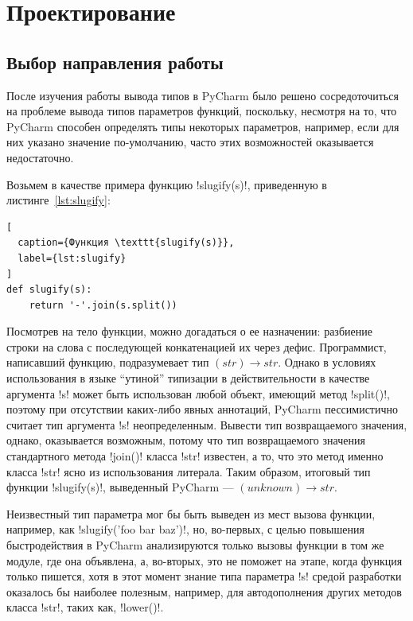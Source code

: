 \chapter{Проектирование}
\label{sec:designing}

\section{Выбор направления работы}
\label{sec:work-direction}

После изучения работы вывода типов в PyCharm было решено сосредоточиться на
проблеме вывода типов параметров функций, поскольку, несмотря на то, что PyCharm
способен определять типы некоторых параметров, например, если для них указано
значение по-умолчанию, часто этих возможностей оказывается недостаточно.

Возьмем в качестве примера функцию !slugify(s)!, приведенную в
листинге~\ref{lst:slugify}:

\begin{lstlisting}[
  caption={Функция \texttt{slugify(s)}},
  label={lst:slugify}
]
def slugify(s):
    return '-'.join(s.split())
\end{lstlisting}

Посмотрев на тело функции, можно догадаться о ее назначении: разбиение строки на
слова с последующей конкатенацией их через дефис. Программист, написавший
функцию, подразумевает тип $(str) \rightarrow str$. Однако в условиях
использования в языке ``утиной'' типизации в действительности в качестве
аргумента !s! может быть использован любой объект, имеющий метод !split()!,
поэтому при отсутствии каких-либо явных аннотаций, PyCharm пессимистично считает
тип аргумента !s!  неопределенным.  Вывести тип возвращаемого значения, однако,
оказывается возможным, потому что тип возвращаемого значения стандартного метода
!join()! класса !str! известен, а то, что это метод именно класса !str! ясно из
использования литерала.  Таким образом, итоговый тип функции !slugify(s)!,
выведенный PyCharm --- $(unknown) \rightarrow str$.

Неизвестный тип параметра мог бы быть выведен из мест вызова функции, например, 
как !slugify('foo bar baz')!, но, во-первых, с целью повышения быстродействия в
PyCharm анализируются только вызовы функции в том же модуле, где она объявлена,
а, во-вторых, это не поможет на этапе, когда функция только пишется, хотя
в этот момент знание типа параметра !s! средой разработки оказалось бы наиболее
полезным, например, для автодополнения других методов класса !str!, таких как,
!lower()!.

